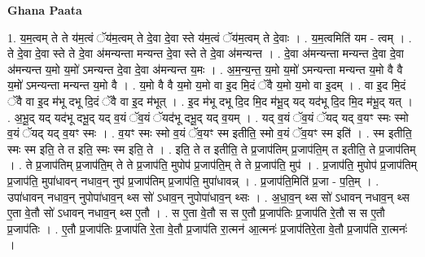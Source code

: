 \documentclass[17pt]{extarticle}
\begin{document}
\textbf{Ghana Paata } \newline

1. य॒म॒त्वम् ते ते य॑म॒त्वं ॅय॑म॒त्वम् ते दे॒वा दे॒वा स्ते य॑म॒त्वं ॅय॑म॒त्वम् ते दे॒वाः । . य॒म॒त्वमिति॑ यम - त्वम् । . ते दे॒वा दे॒वा स्ते ते दे॒वा अ॑मन्यन्ता मन्यन्त दे॒वा स्ते ते दे॒वा अ॑मन्यन्त । . दे॒वा अ॑मन्यन्ता मन्यन्त दे॒वा दे॒वा अ॑मन्यन्त य॒मो य॒मो॑ ऽमन्यन्त दे॒वा दे॒वा अ॑मन्यन्त य॒मः । . अ॒म॒न्य॒न्त॒ य॒मो य॒मो॑ ऽमन्यन्ता मन्यन्त य॒मो वै वै य॒मो॑ ऽमन्यन्ता मन्यन्त य॒मो वै । . य॒मो वै वै य॒मो य॒मो वा इ॒द मि॒दं ॅवै य॒मो य॒मो वा इ॒दम् । . वा इ॒द मि॒दं ॅवै वा इ॒द म॑भू दभू दि॒दं ॅवै वा इ॒द म॑भूत् । . इ॒द म॑भू दभू दि॒द मि॒द म॑भू॒द् यद् यद॑भू दि॒द मि॒द म॑भू॒द् यत् । . अ॒भू॒द् यद् यद॑भू दभू॒द् यद् व॒यं ॅव॒यं ॅयद॑भू दभू॒द् यद् व॒यम् । . यद् व॒यं ॅव॒यं ॅयद् यद् व॒यꣳ स्मः स्मो व॒यं ॅयद् यद् व॒यꣳ स्मः । . व॒यꣳ स्मः स्मो व॒यं ॅव॒यꣳ स्म इतीति॒ स्मो व॒यं ॅव॒यꣳ स्म इति॑ । . स्म इतीति॒ स्मः स्म इति॒ ते त इति॒ स्मः स्म इति॒ ते । . इति॒ ते त इतीति॒ ते प्र॒जाप॑तिम् प्र॒जाप॑ति॒म् त इतीति॒ ते प्र॒जाप॑तिम् । . ते प्र॒जाप॑तिम् प्र॒जाप॑ति॒म् ते ते प्र॒जाप॑ति॒ मुपोप॑ प्र॒जाप॑ति॒म् ते ते प्र॒जाप॑ति॒ मुप॑ । . प्र॒जाप॑ति॒ मुपोप॑ प्र॒जाप॑तिम् प्र॒जाप॑ति॒ मुपा॑धावन् नधाव॒न् नुप॑ प्र॒जाप॑तिम् प्र॒जाप॑ति॒ मुपा॑धावन्न् । . प्र॒जाप॑ति॒मिति॑ प्र॒जा - प॒ति॒म् । . उपा॑धावन् नधाव॒न् नुपोपा॑धाव॒न् थ्स सो॑ ऽधाव॒न् नुपोपा॑धाव॒न् थ्सः । . अ॒धा॒व॒न् थ्स सो॑ ऽधावन् नधाव॒न् थ्स ए॒ता वे॒तौ सो॑ ऽधावन् नधाव॒न् थ्स ए॒तौ । . स ए॒ता वे॒तौ स स ए॒तौ प्र॒जाप॑तिः प्र॒जाप॑ति रे॒तौ स स ए॒तौ प्र॒जाप॑तिः । . ए॒तौ प्र॒जाप॑तिः प्र॒जाप॑ति रे॒ता वे॒तौ प्र॒जाप॑ति रा॒त्मन॑ आ॒त्मनः॑ प्र॒जाप॑तिरे॒ता वे॒तौ प्र॒जाप॑ति रा॒त्मनः॑ । \newline
\end{document}
